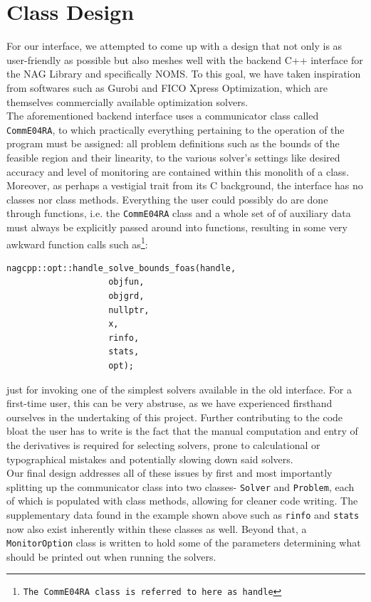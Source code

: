 \documentclass{book}
\begin{document}
\section{Class Design}
For our interface, we attempted to come up with a design that not only is as user-friendly as possible but also meshes well with the backend C++ interface for the NAG Library and specifically NOMS. To this goal, we have taken inspiration from softwares such as Gurobi and FICO Xpress Optimization, which are themselves commercially available optimization solvers.\\
\newline
The aforementioned backend interface uses a communicator class called \texttt{CommE04RA}, to which practically everything pertaining to the operation of the program must be assigned: all problem definitions such as the bounds of the feasible region and their linearity, to the various solver’s settings like desired accuracy and level of monitoring are contained within this monolith of a class. \\
\newline
Moreover, as perhaps a vestigial trait from its C background, the interface has no classes nor class methods. Everything the user could possibly do are done through functions, i.e. the \texttt{CommE04RA} class and a whole set of of auxiliary data must always be explicitly passed around into functions, resulting in some very awkward function calls such as\footnote{\tt The CommE04RA class is referred to here as handle}:
\begin{lstlisting}[basicstyle=\normalsize]
nagcpp::opt::handle_solve_bounds_foas(handle, 
					objfun, 
					objgrd, 
					nullptr, 
					x, 
					rinfo, 
					stats, 
					opt);
\end{lstlisting}
just for invoking one of the simplest solvers available in the old interface. For a first-time user, this can be very abstruse, as we have experienced firsthand ourselves in the undertaking of this project. Further contributing to the code bloat the user has to write is the fact that the manual computation and entry of the derivatives is required for selecting solvers, prone to calculational or typographical mistakes and potentially slowing down said solvers.\\
\newline
Our final design addresses all of these issues by first and most importantly splitting up the communicator class into two classes- \texttt{Solver} and \texttt{Problem}, each of which is populated with class methods, allowing for cleaner code writing. The supplementary data found in the example shown above such as \texttt{rinfo} and \texttt{stats} now also exist inherently within these classes as well. Beyond that, a \texttt{MonitorOption} class is written to hold some of the parameters determining what should be printed out when running the solvers. \\
\end{document}
